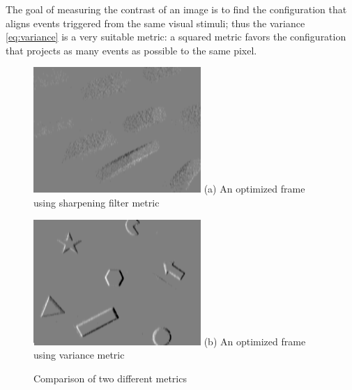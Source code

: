 The goal of measuring the contrast of an image is to find the
configuration that aligns events triggered from the same visual
stimuli; thus the variance \cref{eq:variance} is a very suitable
metric: a squared metric favors the configuration that projects as
many events as possible to the same pixel.

\begin{figure}
  \begin{minipage}[t]{0.48\textwidth}
    \centering \includegraphics[width =
    \textwidth]{images/high_pass_contrast.png}
    (a) An optimized frame using sharpening filter metric
  \end{minipage}
  \hfill
  \begin{minipage}[t]{0.48\textwidth}
    \centering \includegraphics[width =
    \textwidth]{images/variance_contrast.png}
    (b) An optimized frame using variance metric
  \end{minipage}
  \caption{Comparison of two different metrics}
  \label{fig:contrast}
\end{figure}




